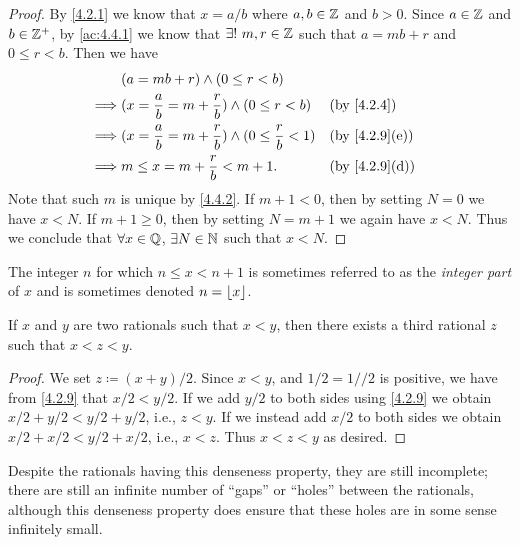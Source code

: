 \begin{proof}
  By \cref{4.2.1} we know that \(x = a / b\) where \(a, b \in \mathbb{Z}\) and \(b > 0\).
  Since \(a \in \mathbb{Z}\) and \(b \in \mathbb{Z}^+\), by \cref{ac:4.4.1} we know that \(\exists!\ m, r \in \mathbb{Z}\) such that \(a = mb + r\) and \(0 \leq r < b\).
  Then we have
  \begin{align*}
             & (a = mb + r) \land (0 \leq r < b)                                                                      \\
    \implies & (x = \dfrac{a}{b} = m + \dfrac{r}{b}) \land (0 \leq r < b)            &  & \by{4.2.4}                  \\
    \implies & (x = \dfrac{a}{b} = m + \dfrac{r}{b}) \land (0 \leq \dfrac{r}{b} < 1) &  & \text{(by \cref{4.2.9}(e))} \\
    \implies & m \leq x = m + \dfrac{r}{b} < m + 1.                                  &  & \text{(by \cref{4.2.9}(d))}
  \end{align*}
  Note that such \(m\) is unique by \cref{4.4.2}.
  If \(m + 1 < 0\), then by setting \(N = 0\) we have \(x < N\).
  If \(m + 1 \geq 0\), then by setting \(N = m + 1\) we again have \(x < N\).
  Thus we conclude that \(\forall x \in \mathbb{Q}\), \(\exists N \in \mathbb{N}\) such that \(x < N\).
\end{proof}

\begin{rmk}\label{4.4.2}
  The integer \(n\) for which \(n \leq x < n + 1\) is sometimes referred to as the \emph{integer part} of \(x\) and is sometimes denoted \(n = \left\lfloor x\right\rfloor\).
\end{rmk}

\begin{prop}\label{4.4.3}
  If \(x\) and \(y\) are two rationals such that \(x < y\), then there exists a third rational \(z\) such that \(x < z < y\).
\end{prop}

\begin{proof}
  We set \(z \coloneqq (x + y) / 2\).
  Since \(x < y\), and \(1 / 2 = 1 // 2\) is positive, we have from \cref{4.2.9} that \(x / 2 < y / 2\).
  If we add \(y / 2\) to both sides using \cref{4.2.9} we obtain \(x / 2 + y / 2 < y / 2 + y / 2\), i.e., \(z < y\).
  If we instead add \(x / 2\) to both sides we obtain \(x / 2 + x / 2 < y / 2 + x / 2\), i.e., \(x < z\).
  Thus \(x < z < y\) as desired.
\end{proof}

\begin{note}
  Despite the rationals having this denseness property, they are still incomplete;
  there are still an infinite number of ``gaps'' or ``holes'' between the rationals, although this denseness property does ensure that these holes are in some sense infinitely small.
\end{note}

